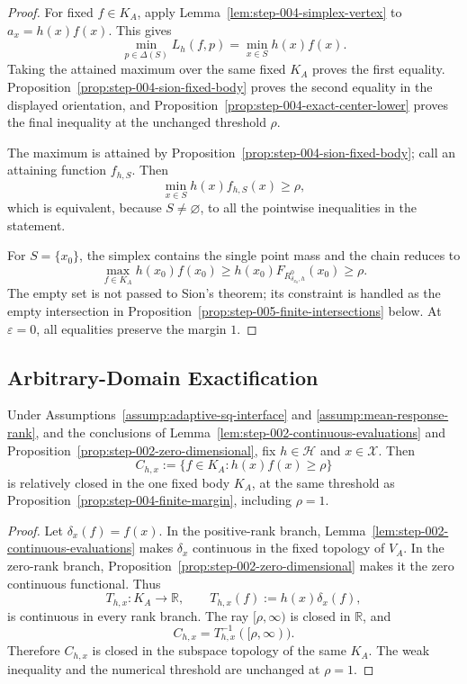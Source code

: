 \begin{proof}
For fixed \(f\in K_A\), apply
Lemma~\ref{lem:step-004-simplex-vertex} to
\(a_x=h(x)f(x)\).  This gives
\[
\min_{p\in\Delta(S)}L_h(f,p)
=\min_{x\in S}h(x)f(x).
\]
Taking the attained maximum over the same fixed \(K_A\) proves the first
equality.  Proposition~\ref{prop:step-004-sion-fixed-body} proves the second
equality in the displayed orientation, and
Proposition~\ref{prop:step-004-exact-center-lower} proves the final inequality
at the unchanged threshold \(\rho\).

The maximum is attained by
Proposition~\ref{prop:step-004-sion-fixed-body}; call an attaining function
\(f_{h,S}\).  Then
\[
\min_{x\in S}h(x)f_{h,S}(x)\ge\rho,
\]
which is equivalent, because \(S\ne\varnothing\), to all the pointwise
inequalities in the statement.

For \(S=\{x_0\}\), the simplex contains the single point mass and the chain
reduces to
\[
\max_{f\in K_A}h(x_0)f(x_0)
\ge h(x_0)F_{R^0_{\delta_{x_0},h}}(x_0)
\ge\rho.
\]
The empty set is not passed to Sion's theorem; its constraint is handled as
the empty intersection in Proposition~\ref{prop:step-005-finite-intersections}
below.  At \(\varepsilon=0\), all equalities preserve the margin \(1\).
\end{proof}

\subsection{Arbitrary-Domain Exactification}
\label{app:step-005}

\begin{lemma}
\label{lem:step-005-closed-constraints}
Under Assumptions~\ref{assump:adaptive-sq-interface} and
\ref{assump:mean-response-rank}, and the conclusions of
Lemma~\ref{lem:step-002-continuous-evaluations} and
Proposition~\ref{prop:step-002-zero-dimensional}, fix \(h\in\mathcal H\) and
\(x\in\mathcal X\).  Then
\[
C_{h,x}:=\{f\in K_A:h(x)f(x)\ge\rho\}
\]
is relatively closed in the one fixed body \(K_A\), at the same threshold as
Proposition~\ref{prop:step-004-finite-margin}, including \(\rho=1\).
\end{lemma}

\begin{proof}
Let \(\delta_x(f)=f(x)\).  In the positive-rank branch,
Lemma~\ref{lem:step-002-continuous-evaluations} makes \(\delta_x\) continuous
in the fixed topology of \(V_A\).  In the zero-rank branch,
Proposition~\ref{prop:step-002-zero-dimensional} makes it the zero continuous
functional.  Thus
\[
T_{h,x}:K_A\to\mathbb R,
\qquad T_{h,x}(f):=h(x)\delta_x(f),
\]
is continuous in every rank branch.  The ray \([\rho,\infty)\) is closed in
\(\mathbb R\), and
\[
C_{h,x}=T_{h,x}^{-1}([\rho,\infty)).
\]
Therefore \(C_{h,x}\) is closed in the subspace topology of the same
\(K_A\).  The weak inequality and the numerical threshold are unchanged at
\(\rho=1\).
\end{proof}

